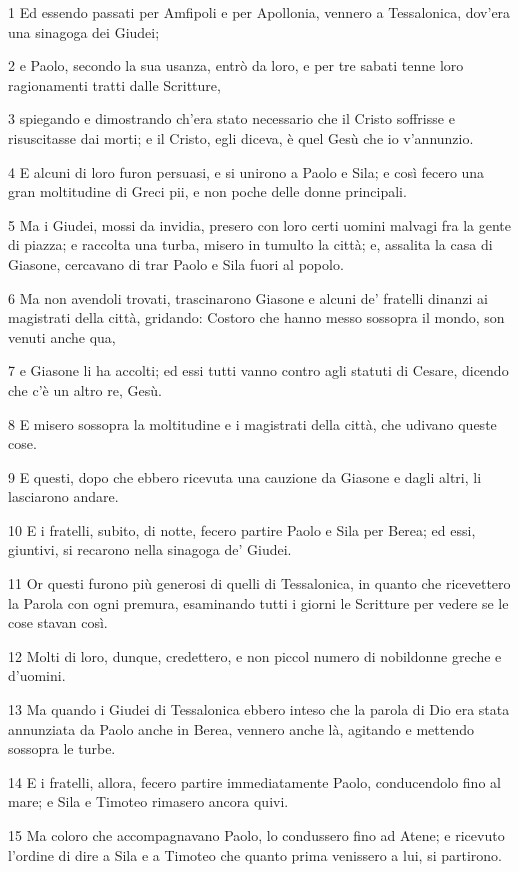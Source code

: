 \par 1 Ed essendo passati per Amfipoli e per Apollonia, vennero a Tessalonica, dov'era una sinagoga dei Giudei;
\par 2 e Paolo, secondo la sua usanza, entrò da loro, e per tre sabati tenne loro ragionamenti tratti dalle Scritture,
\par 3 spiegando e dimostrando ch'era stato necessario che il Cristo soffrisse e risuscitasse dai morti; e il Cristo, egli diceva, è quel Gesù che io v'annunzio.
\par 4 E alcuni di loro furon persuasi, e si unirono a Paolo e Sila; e così fecero una gran moltitudine di Greci pii, e non poche delle donne principali.
\par 5 Ma i Giudei, mossi da invidia, presero con loro certi uomini malvagi fra la gente di piazza; e raccolta una turba, misero in tumulto la città; e, assalita la casa di Giasone, cercavano di trar Paolo e Sila fuori al popolo.
\par 6 Ma non avendoli trovati, trascinarono Giasone e alcuni de' fratelli dinanzi ai magistrati della città, gridando: Costoro che hanno messo sossopra il mondo, son venuti anche qua,
\par 7 e Giasone li ha accolti; ed essi tutti vanno contro agli statuti di Cesare, dicendo che c'è un altro re, Gesù.
\par 8 E misero sossopra la moltitudine e i magistrati della città, che udivano queste cose.
\par 9 E questi, dopo che ebbero ricevuta una cauzione da Giasone e dagli altri, li lasciarono andare.
\par 10 E i fratelli, subito, di notte, fecero partire Paolo e Sila per Berea; ed essi, giuntivi, si recarono nella sinagoga de' Giudei.
\par 11 Or questi furono più generosi di quelli di Tessalonica, in quanto che ricevettero la Parola con ogni premura, esaminando tutti i giorni le Scritture per vedere se le cose stavan così.
\par 12 Molti di loro, dunque, credettero, e non piccol numero di nobildonne greche e d'uomini.
\par 13 Ma quando i Giudei di Tessalonica ebbero inteso che la parola di Dio era stata annunziata da Paolo anche in Berea, vennero anche là, agitando e mettendo sossopra le turbe.
\par 14 E i fratelli, allora, fecero partire immediatamente Paolo, conducendolo fino al mare; e Sila e Timoteo rimasero ancora quivi.
\par 15 Ma coloro che accompagnavano Paolo, lo condussero fino ad Atene; e ricevuto l'ordine di dire a Sila e a Timoteo che quanto prima venissero a lui, si partirono.
